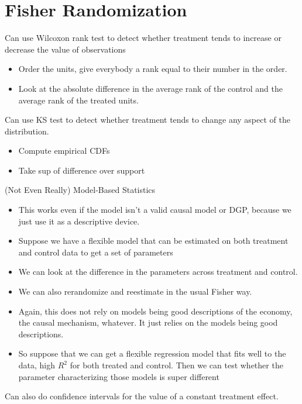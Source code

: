 \documentclass[12pt]{article}
\theoremstyle{plain}
\theoremstyle{definition}
\theoremstyle{remark}
\begin{document}
\clearpage
\section{Fisher Randomization}

Can use Wilcoxon rank test to detect whether treatment tends to increase
or decrease the value of observations
\begin{itemize}
  \item Order the units, give everybody a rank equal to their number in
    the order.
  \item Look at the absolute difference in the average rank of the
    control and the average rank of the treated units.
\end{itemize}
Can use KS test to detect whether treatment tends to change any aspect
of the distribution.
\begin{itemize}
  \item Compute empirical CDFs
  \item Take sup of difference over support
\end{itemize}
(Not Even Really) Model-Based Statistics
\begin{itemize}
  \item This works even if the model isn't a valid causal model or DGP,
    because we just use it as a descriptive device.

  \item Suppose we have a flexible model that can be estimated on both
    treatment and control data to get a set of parameters

  \item We can look at the difference in the parameters across treatment
    and control.

  \item We can also rerandomize and reestimate in the usual Fisher way.

  \item Again, this does not rely on models being good descriptions of
    the economy, the causal mechanism, whatever.
    It just relies on the models being good descriptions.

  \item
    So suppose that we can get a flexible regression model that fits
    well to the data, high $R^2$ for both treated and control.
    Then we can test whether the parameter characterizing those models
    is super different
\end{itemize}
Can also do confidence intervals for the value of a constant treatment
effect.
\end{document}

